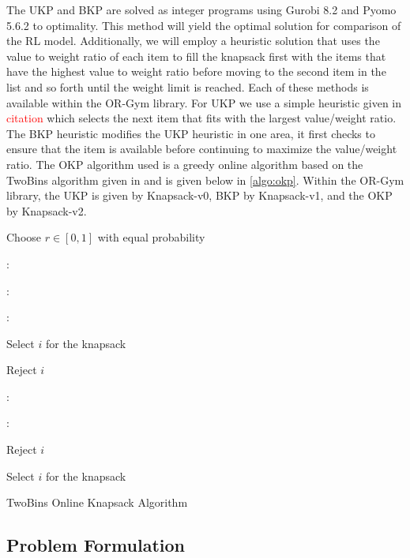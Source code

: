 \documentclass[12pt]{article}
\begin{document}
The UKP and BKP are solved as integer programs using Gurobi 8.2 and Pyomo 5.6.2 to optimality.
This method will yield the optimal solution for comparison of the RL model. 
Additionally, we will employ a heuristic solution that uses the value to weight ratio of each item to fill the knapsack first with the items that have the highest value to weight ratio before moving to the second item in the list and so forth until the weight limit is reached.
Each of these methods is available within the OR-Gym library.
For UKP we use a simple heuristic given in \textcolor{red}{citation} which selects the next item that fits with the largest value/weight ratio. 
The BKP heuristic modifies the UKP heuristic in one area, it first checks to ensure that the item is available before continuing to maximize the value/weight ratio. 
The OKP algorithm used is a greedy online algorithm based on the TwoBins algorithm given in \citet{Han2015} and is given below in \ref{algo:okp}.
Within the OR-Gym library, the UKP is given by Knapsack-v0, BKP by Knapsack-v1, and the OKP by Knapsack-v2. 

\begin{algorithm}
\begin{algorithmic}[1]
\Require
Choose $r \in [0, 1]$ with equal probability \par
{}: \par
    : \par
        : \par
            Select $i$ for the knapsack \par
        \Else \par
            Reject $i$ \par
        \EndIf \par
    : \par
        : \par
            Reject $i$
        \Else \par
            Select $i$ for the knapsack \par
        \EndIf \par
    \EndIf \par
\EndFor \par
\end{algorithmic}
\caption{\footnotesize TwoBins Online Knapsack Algorithm}
\label{algo:okp}
\end{algorithm}

\subsection{Problem Formulation}
\end{document}
